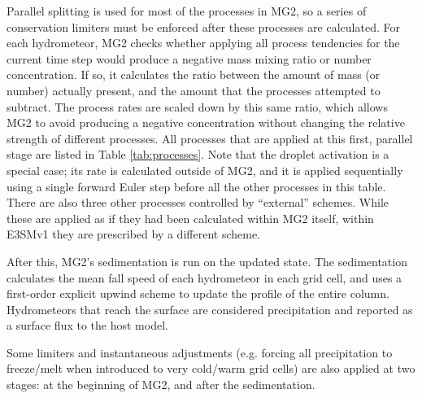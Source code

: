 \documentclass [11pt, proquest] {uwthesis}[2020/02/24]
\begin{document}
Parallel splitting is used for most of the processes in MG2, so a series of conservation limiters must be enforced after these processes are calculated. For each hydrometeor, MG2 checks whether applying all process tendencies for the current time step would produce a negative mass mixing ratio or number concentration. If so, it calculates the ratio between the amount of mass (or number) actually present, and the amount that the processes attempted to subtract. The process rates are scaled down by this same ratio, which allows MG2 to avoid producing a negative concentration without changing the relative strength of different processes. All processes that are applied at this first, parallel stage are listed in Table \ref{tab:processes}. Note that the droplet activation is a special case; its rate is calculated outside of MG2, and it is applied sequentially using a single forward Euler step before all the other processes in this table. There are also three other processes controlled by ``external'' schemes. While these are applied as if they had been calculated within MG2 itself, within E3SMv1 they are prescribed by a different scheme.

After this, MG2's sedimentation is run on the updated state. The sedimentation calculates the mean fall speed of each hydrometeor in each grid cell, and uses a first-order explicit upwind scheme to update the profile of the entire column. Hydrometeors that reach the surface are considered precipitation and reported as a surface flux to the host model.

Some limiters and instantaneous adjustments (e.g. forcing all precipitation to freeze/melt when introduced to very cold/warm grid cells) are also applied at two stages: at the beginning of MG2, and after the sedimentation.
\end{document}
